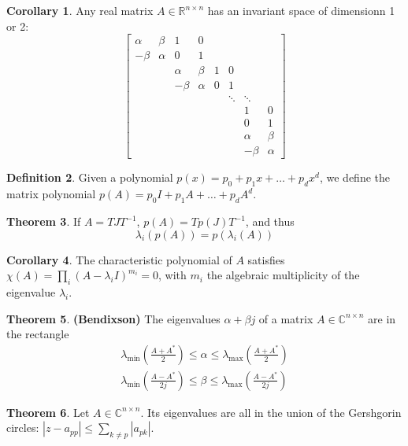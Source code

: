 \documentclass[12pt, openany]{report}
\theoremstyle{definition}
\newtheorem{thm}{Theorem}[chapter]
\newtheorem{definition}[thm]{Definition}
\newtheorem{corollary}[thm]{Corollary}
\newcommand{\R}{\mathbb{R}}
\newcommand{\C}{\mathbb{C}}
\begin{document}
\begin{corollary}
    Any real matrix $A\in \R^{n\times n}$ has an invariant space of dimensionn 1 or 2:
    \begin{equation}
        \begin{bmatrix}
            \alpha & \beta & 1 & 0 &&\\
            -\beta & \alpha & 0 & 1&&\\
            & & \alpha & \beta & 1& 0&& \\
            & & -\beta & \alpha & 0 & 1&&\\
            &&&&& \ddots & \ddots &\\
            &&&&&& 1&0\\
            &&&&&& 0&1\\
            &&&&&& \alpha & \beta\\
            &&&&&& -\beta & \alpha
        \end{bmatrix}
    \end{equation}
\end{corollary}
\begin{definition}
    Given a polynomial $p(x) = p_0+p_1x+ \dots + p_d x^d$, we define the matrix polynomial $p(A) = p_0 I+p_1A+ \dots + p_d A^d$.
\end{definition}
\begin{thm}
    If $A=TJT^{-1}$, $p(A)=Tp(J)T^{-1}$, and thus 
    \begin{equation}
        \lambda_i(p(A)) = p(\lambda_i(A))
    \end{equation}
\end{thm}
\begin{corollary}
    The characteristic polynomial of $A$ satisfies $\chi(A)=\prod_i (A-\lambda_iI)^{m_i}=0$, with $m_i$ the algebraic multiplicity of the eigenvalue $\lambda_i$.
\end{corollary}
\begin{thm}\textbf{(Bendixson)}
    The eigenvalues $\alpha+\beta j$ of a matrix $A\in \C^{n\times n}$  are in the rectangle 
    \begin{align}
        \lambda_{\min} \left(\frac{A+A^*}{2}\right) \le \alpha \le \lambda_{\max} \left(\frac{A+A^*}{2}\right)\\
        \lambda_{\min} \left(\frac{A-A^*}{2j}\right) \le \beta \le \lambda_{\max} \left(\frac{A-A^*}{2j}\right)
    \end{align}
\end{thm}
\begin{thm}
    Let $A\in \C^{n\times n}$. Its eigenvalues are all in the union of the Gershgorin circles: $|z-a_{pp}| \le \sum_{k\neq p} |a_{pk}|$. \\
\end{thm}
\end{document}
